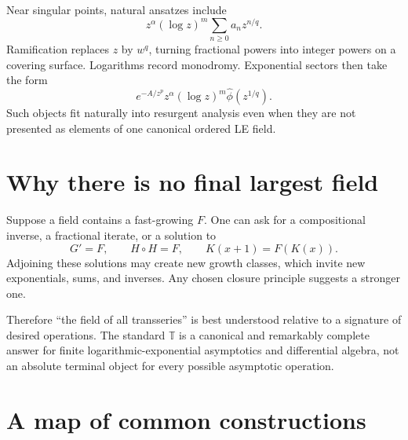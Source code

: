 \documentclass[11pt,openany]{book}
\theoremstyle{definition}
\theoremstyle{plain}
\theoremstyle{remark}
\newcommand{\T}{\mathbb{T}}
\newcommand{\trans}[1]{\widehat{#1}}
\begin{document}
Near singular points, natural ansatzes include
\[
 z^\alpha(\log z)^m
 \sum_{n\ge0}a_nz^{n/q}.
\]
Ramification replaces $z$ by $w^q$, turning fractional powers into integer powers on a covering surface. Logarithms record monodromy. Exponential sectors then take the form
\[
 e^{-A/z^p}z^\alpha(\log z)^m\trans\phi(z^{1/q}).
\]
Such objects fit naturally into resurgent analysis even when they are not presented as elements of one canonical ordered LE field.

\section{Why there is no final largest field}

Suppose a field contains a fast-growing $F$. One can ask for a compositional inverse, a fractional iterate, or a solution to
\[
 G'=F,
 \qquad
 H\circ H=F,
 \qquad
 K(x+1)=F(K(x)).
\]
Adjoining these solutions may create new growth classes, which invite new exponentials, sums, and inverses. Any chosen closure principle suggests a stronger one.

Therefore ``the field of all transseries'' is best understood relative to a signature of desired operations. The standard $\T$ is a canonical and remarkably complete answer for finite logarithmic-exponential asymptotics and differential algebra, not an absolute terminal object for every possible asymptotic operation.

\section{A map of common constructions}
\end{document}
